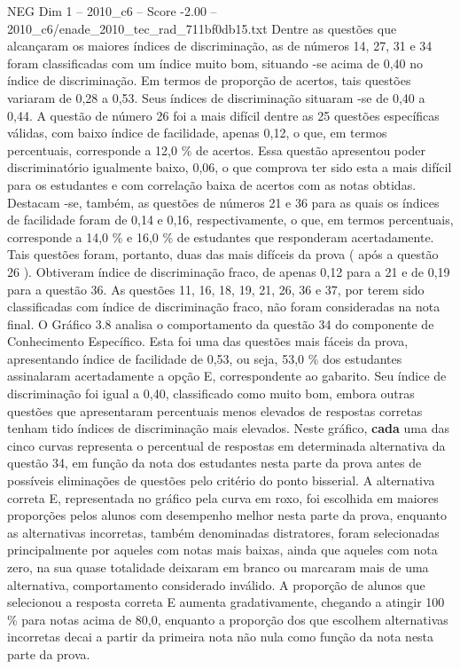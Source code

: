 \begin{textsample}{NEG Dim 1 – 2010\_c6 – Score -2.00 – 2010\_c6/enade\_2010\_tec\_rad\_711bf0db15.txt}
Dentre as questões que alcançaram os maiores índices de discriminação, as de números 14, 27, 31 e 34 foram classificadas com um índice muito bom, situando -se acima de 0,40 no índice de discriminação.
Em termos de proporção de acertos, tais questões variaram de 0,28 a 0,53.
Seus índices de discriminação situaram -se de 0,40 a 0,44.
A questão de número 26 foi a mais difícil dentre as 25 questões específicas válidas, com baixo índice de facilidade, apenas 0,12, o que, em termos percentuais, corresponde a 12,0 \% de acertos.
Essa questão apresentou poder discriminatório igualmente baixo, 0,06, o que comprova ter sido esta a mais difícil para os estudantes e com correlação baixa de acertos com as notas obtidas.
Destacam -se, também, as questões de números 21 e 36 para as quais os índices de facilidade foram de 0,14 e 0,16, respectivamente, o que, em termos percentuais, corresponde a 14,0 \% e 16,0 \% de estudantes que responderam acertadamente.
Tais questões foram, portanto, duas das mais difíceis da prova ( após a questão 26 ).
Obtiveram índice de discriminação fraco, de apenas 0,12 para a 21 e de 0,19 para a questão 36.
As questões 11, 16, 18, 19, 21, 26, 36 e 37, por terem sido classificadas com índice de discriminação fraco, não foram consideradas na nota final.
O Gráfico 3.8 analisa o comportamento da questão 34 do componente de Conhecimento Específico.
Esta foi uma das questões mais fáceis da prova, apresentando índice de facilidade de 0,53, ou seja, 53,0 \% dos estudantes assinalaram acertadamente a opção E, correspondente ao gabarito.
Seu índice de discriminação foi igual a 0,40, classificado como muito bom, embora outras questões que apresentaram percentuais menos elevados de respostas corretas tenham tido índices de discriminação mais elevados.
Neste gráfico, \textbf{cada} uma das cinco curvas representa o percentual de respostas em determinada alternativa da questão 34, em função da nota dos estudantes nesta parte da prova antes de possíveis eliminações de questões pelo critério do ponto bisserial.
A alternativa correta E, representada no gráfico pela curva em roxo, foi escolhida em maiores proporções pelos alunos com desempenho melhor nesta parte da prova, enquanto as alternativas incorretas, também denominadas distratores, foram selecionadas principalmente por aqueles com notas mais baixas, ainda que aqueles com nota zero, na sua quase totalidade deixaram em branco ou marcaram mais de uma alternativa, comportamento considerado inválido.
A proporção de alunos que selecionou a resposta correta E aumenta gradativamente, chegando a atingir 100 \% para notas acima de 80,0, enquanto a proporção dos que escolhem alternativas incorretas decai a partir da primeira nota não nula como função da nota nesta parte da prova.

\end{textsample}
